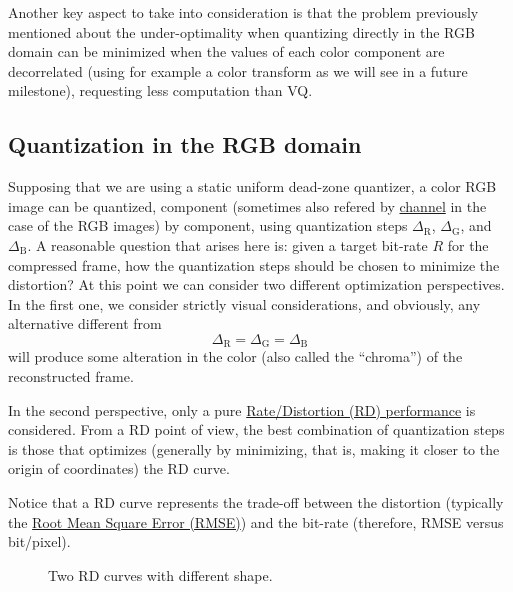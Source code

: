 Another key aspect to take into consideration is that the problem
previously mentioned about the under-optimality when quantizing
directly in the RGB domain can be minimized when the values of each
color component are decorrelated (using for example a color transform
as we will see in a future milestone), requesting less computation
than VQ.

\subsection{Quantization in the RGB domain}
Supposing that we are using a static uniform dead-zone quantizer, a
color RGB image can be quantized, component (sometimes also refered by
\href{https://en.wikipedia.org/wiki/Color_image}{channel} in the case
of the RGB images) by component, using quantization steps
$\Delta_{\text{R}}$, $\Delta_{\text{G}}$, and $\Delta_{\text{B}}$. A
reasonable question that arises here is: given a target bit-rate $R$
for the compressed frame, how the quantization steps should be chosen
to minimize the distortion? At this point we can consider two
different optimization perspectives. In the first one, we consider
strictly visual considerations, and obviously, any alternative
different from
\begin{equation}
  \Delta_{\text{R}} = \Delta_{\text{G}} = \Delta_{\text{B}}
  \label{eq:simple_Q}
\end{equation}
will produce some alteration in the color (also called the
``chroma'') of the reconstructed frame.

In the second perspective, only a pure
\href{https://en.wikipedia.org/wiki/Rate-distortion_theory}{Rate/Distortion
  (RD) performance} is considered. From a RD point of view, the best
combination of quantization steps is those that optimizes (generally
by minimizing, that is, making it closer to the origin of coordinates)
the RD curve.

Notice that a RD curve represents the trade-off between the distortion
(typically the
\href{https://en.wikipedia.org/wiki/Root-mean-square_deviation}{Root
  Mean Square Error (RMSE)}) and the bit-rate (therefore, RMSE versus
bit/pixel).

\begin{figure}
  \centering
  \caption{Two RD curves with different shape.}
  \label{fig:RD_slopes}
\end{figure}

